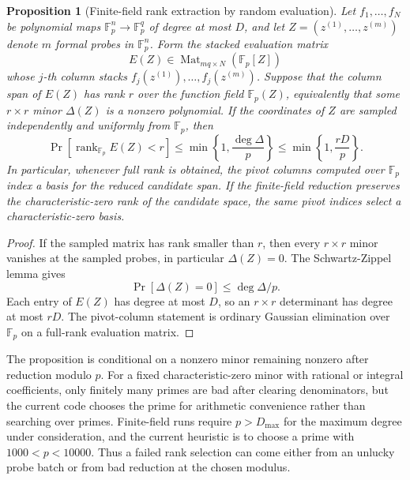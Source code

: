 \documentclass[11pt]{article}
\newcommand{\dsF}{\mathbb{F}}
\newtheorem{proposition}[theorem]{Proposition}
\theoremstyle{definition}
\begin{document}
\begin{proposition}[Finite-field rank extraction by random evaluation]\label{prop:random-rank-test}
  Let $f_1,\dots,f_N$ be polynomial maps $\dsF_p^n\to\dsF_p^q$ of degree at most $D$, and let $Z=(z^{(1)},\dots,z^{(m)})$ denote $m$ formal probes in $\dsF_p^n$.
  Form the stacked evaluation matrix
  \[
    E(Z)\in \operatorname{Mat}_{mq\times N}\left(\dsF_p[Z]\right)
  \]
  whose $j$-th column stacks $f_j(z^{(1)}),\dots,f_j(z^{(m)})$.
  Suppose that the column span of $E(Z)$ has rank $r$ over the function field $\dsF_p(Z)$, equivalently that some $r\times r$ minor $\Delta(Z)$ is a nonzero polynomial.
  If the coordinates of $Z$ are sampled independently and uniformly from $\dsF_p$, then
  \[
    \Pr\left[\operatorname{rank}_{\dsF_p}E(Z)<r\right]
    \le
    \min\left\{1,\frac{\deg\Delta}{p}\right\}
    \le
    \min\left\{1,\frac{rD}{p}\right\}.
  \]
  In particular, whenever full rank is obtained, the pivot columns computed over $\dsF_p$ index a basis for the reduced candidate span.
  If the finite-field reduction preserves the characteristic-zero rank of the candidate space, the same pivot indices select a characteristic-zero basis.
\end{proposition}
\begin{proof}
  If the sampled matrix has rank smaller than $r$, then every $r\times r$ minor vanishes at the sampled probes, in particular $\Delta(Z)=0$.
  The Schwartz-Zippel lemma gives
  \[
    \Pr[\Delta(Z)=0]\le \deg\Delta/p.
  \]
  Each entry of $E(Z)$ has degree at most $D$, so an $r\times r$ determinant has degree at most $rD$.
  The pivot-column statement is ordinary Gaussian elimination over $\dsF_p$ on a full-rank evaluation matrix.
\end{proof}

The proposition is conditional on a nonzero minor remaining nonzero after reduction modulo $p$.
For a fixed characteristic-zero minor with rational or integral coefficients, only finitely many primes are bad after clearing denominators, but the current code chooses the prime for arithmetic convenience rather than searching over primes.
Finite-field runs require $p>D_{\max}$ for the maximum degree under consideration, and the current heuristic is to choose a prime with $1000<p<10000$.
Thus a failed rank selection can come either from an unlucky probe batch or from bad reduction at the chosen modulus.
\end{document}
